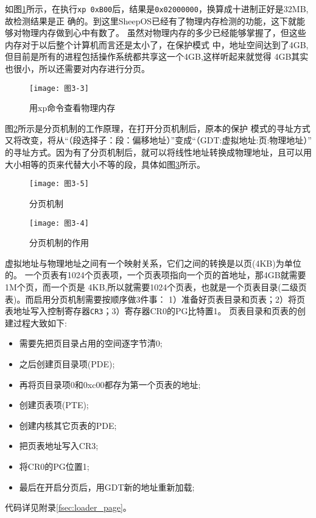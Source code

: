 如图\ref{fig:xp}所示，在执行\texttt{xp 0xB00}后，结果是\texttt{0x02000000}，换算成十进制正好是32MB,故检测结果是正
确的。到这里SheepOS已经有了物理内存检测的功能，这下就能够对物理内存做到心中有数了。
虽然对物理内存的多少已经能够掌握了，但这些内存对于以后整个计算机而言还是太小了，在保护模式
中，地址空间达到了4GB,但目前是所有的进程包括操作系统都共享这一个4GB,这样听起来就觉得
4GB其实也很小，所以还需要对内存进行分页。

\begin{figure}
  \centering
  \texttt{[image: 图3-3]}
  \caption{用xp命令查看物理内存}
  \label{fig:xp}
\end{figure}

图\ref{fig:fenye}所示是分页机制的工作原理，在打开分页机制后，原本的保护
模式的寻址方式又将改变，将从“（段选择子：段：偏移地址）”变成“（GDT:虚拟地址:页:物理地址）”
的寻址方式。因为有了分页机制后，就可以将线性地址转换成物理地址，且可以用
大小相等的页来代替大小不等的段，具体如图\ref{fig:fenyezy}所示。

\begin{figure}
  \centering
  \texttt{[image: 图3-5]}
  \caption{分页机制}
  \label{fig:fenye}
\end{figure}

\begin{figure}[H]
  \centering
  \texttt{[image: 图3-4]}
  \caption{分页机制的作用}
  \label{fig:fenyezy}
\end{figure}

虚拟地址与物理地址之间有一个映射关系，它们之间的转换是以页(4KB)为单位的。
一个页表有1024个页表项，一个页表项指向一个页的首地址，那4GB就需要1M个页，而一个页是
4KB,所以就需要1024个页表，也就是一个页表目录(二级页表)。而启用分页机制需要按顺序做3件事：
1）准备好页表目录和页表；2）将页表地址写入控制寄存器\texttt{CR3}；3）寄存器CR0的PG比特置1。
页表目录和页表的创建过程大致如下:

\begin{itemize}
\item 需要先把页目录占用的空间逐字节清0;
\item 之后创建页目录项(PDE);
\item 再将页目录项0和0xc00都存为第一个页表的地址;
\item 创建页表项(PTE);
\item 创建内核其它页表的PDE;
\item 把页表地址写入CR3;
\item 将CR0的PG位置1;
\item 最后在开启分页后，用GDT新的地址重新加载;
\end{itemize}
代码详见附录\ref{fsec:loader_page}。

